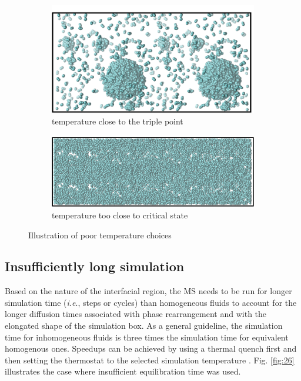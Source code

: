 \documentclass[9pt,bestpractices]{livecoms}
\begin{document}
\begin{figure}
	\centering
	\begin{subfigure}{0.38\textwidth} %
    \includegraphics[width=1\textwidth]{gfx/image75.png}
    \caption{temperature close to the triple point}
	\end{subfigure}
	\begin{subfigure}{0.38\textwidth} %
    \includegraphics[width=1\textwidth]{gfx/image76.png}
    \caption{temperature too close to critical state}
	\end{subfigure}
\caption{Illustration of poor temperature choices}
\label{fig:25}
\end{figure}

\subsection{Insufficiently long simulation} 

Based on the nature of the interfacial region, the MS needs to be run for
longer simulation time (\textit{i.e}., steps or cycles) than homogeneous fluids
to account for the longer diffusion times associated with phase rearrangement
and with the elongated shape of the simulation box. As a general guideline, the
simulation time for inhomogeneous fluids is three times the simulation time for
equivalent homogenous ones. Speedups can be achieved by using a thermal quench
first and then setting the thermostat to the selected simulation temperature
\citep{gelb2002}. Fig. \ref{fig:26} illustrates the case where insufficient equilibration time was
used.
\end{document}
